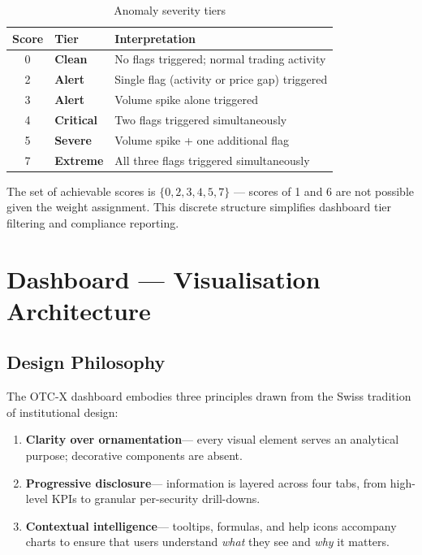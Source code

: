 \documentclass[
  11pt,
  a4paper,
  twoside,
  openany
]{report}
\begin{document}
\begin{table}[H]
\centering
\caption{Anomaly severity tiers}
\label{tab:severity}
\begin{tabularx}{\textwidth}{c l X}
\toprule
\textbf{Score} & \textbf{Tier} & \textbf{Interpretation} \\
\midrule
\cellcolor{CleanGreen!15} 0 & \textcolor{CleanGreen}{\textbf{Clean}} & No flags triggered; normal trading activity \\
\cellcolor{WarnAmber!15} 2 & \textcolor{WarnAmber}{\textbf{Alert}} & Single flag (activity or price gap) triggered \\
\cellcolor{WarnAmber!15} 3 & \textcolor{WarnAmber}{\textbf{Alert}} & Volume spike alone triggered \\
\cellcolor{CriticalOrange!15} 4 & \textcolor{CriticalOrange}{\textbf{Critical}} & Two flags triggered simultaneously \\
\cellcolor{SevereRed!15} 5 & \textcolor{SevereRed}{\textbf{Severe}} & Volume spike + one additional flag \\
\cellcolor{SevereRed!20} 7 & \textcolor{SevereRed}{\textbf{Extreme}} & All three flags triggered simultaneously \\
\bottomrule
\end{tabularx}
\end{table}

\begin{insightbox}
The set of achievable scores is $\{0, 2, 3, 4, 5, 7\}$ — scores of 1 and 6 are not possible given the weight assignment.  This discrete structure simplifies dashboard tier filtering and compliance reporting.
\end{insightbox}


\chapter{Dashboard — Visualisation Architecture}
\label{ch:dashboard}

\section{Design Philosophy}

The OTC-X dashboard embodies three principles drawn from the Swiss tradition of institutional design:

\begin{enumerate}[label=\textcolor{SwissRed}{\textbf{\arabic*.}}]
  \item \textbf{Clarity over ornamentation}\;— every visual element serves an analytical purpose; decorative components are absent.
  \item \textbf{Progressive disclosure}\;— information is layered across four tabs, from high-level KPIs to granular per-security drill-downs.
  \item \textbf{Contextual intelligence}\;— tooltips, formulas, and help icons accompany charts to ensure that users understand \emph{what} they see and \emph{why} it matters.
\end{enumerate}
\end{document}
